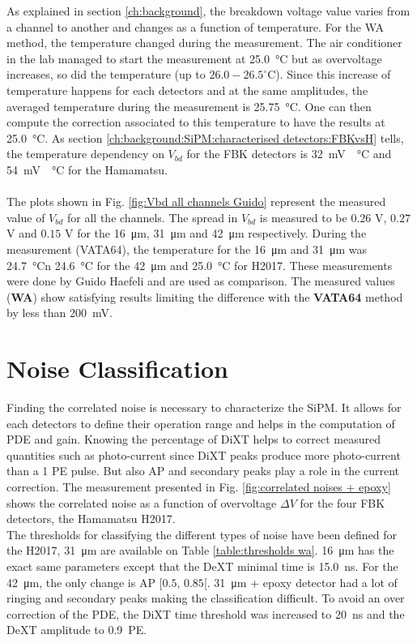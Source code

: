 As explained in section \ref{ch:background}, the breakdown voltage value varies from a channel to another and changes as a function of temperature. 
For the WA method, the temperature changed during the measurement. The air conditioner in the lab managed to start the measurement at \SI{25.0}{\celsius} but as overvoltage increases, so did the temperature (up to $26.0-26.5 ^\circ$C). Since this increase of temperature happens for each detectors and at the same amplitudes, the averaged temperature during the measurement is \SI{25.75}{\celsius}. One can then compute the correction associated to this temperature to have the results at \SI{25.0}{\celsius}. As section \ref{ch:background:SiPM:characterised detectors:FBKvsH} tells, the temperature dependency on $V_{bd}$ for the FBK detectors is \SI{32}{\milli V \per \celsius} and \SI{54}{\milli V \per \celsius} for the Hamamatsu. \\
\\
The plots shown in Fig. \ref{fig:Vbd all channels Guido} represent the measured value of $V_{bd}$ for all the channels. The spread in $V_{bd}$ is measured to be $ 0.26$ V, $0.27$V and $0.15$ V for the \SI{16}{\micro m}, \SI{31}{\micro m} and \SI{42}{\micro m} respectively. During the measurement (VATA64), the temperature for the \SI{16}{\micro m} and \SI{31}{\micro m} was \SI{24.7}{\celsius}n \SI{24.6}{\celsius} for the \SI{42}{\micro m} and \SI{25.0}{\celsius} for H2017. 
These measurements were done by Guido Haefeli and are used as comparison. The measured values (\textbf{WA}) show satisfying results limiting the difference with the \textbf{VATA64} method by less than \SI{200}{\milli V}. 

\section{Noise Classification}
\label{ch:Results:Noise Classification}
Finding the correlated noise is necessary to characterize the SiPM. It allows for each detectors to define their operation range and helps in the computation of PDE and gain. Knowing the percentage of DiXT helps to correct measured quantities such as photo-current since DiXT peaks produce more photo-current than a 1 \ac{PE} pulse. But also AP and secondary peaks play a role in the current correction.
The measurement presented in Fig. \ref{fig:correlated noises + epoxy} shows the correlated noise as a function of overvoltage $\Delta V$ for the four FBK detectors, the Hamamatsu H2017. 
\\
The thresholds for classifying the different types of noise have been defined for the H2017, \SI{31}{\micro m} are available on Table \ref{table:thresholds wa}. \SI{16}{\micro m} has the exact same parameters except that the DeXT minimal time is \SI{15.0}{\nano s}. For the \SI{42}{\micro m}, the only change is AP [$ 0.5$, $ 0.85 $[. \SI{31}{\micro m} + epoxy detector had a lot of ringing  and secondary peaks making the classification difficult. To avoid an over correction of the PDE, the DiXT time threshold was increased to \SI{20}{\nano s} and the DeXT amplitude to \SI{0.9}{PE}.

